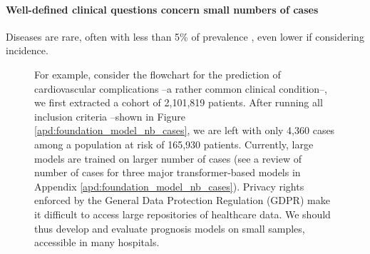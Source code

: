 \documentclass[french,12pt,twoside,a4paper]{book}
\begin{document}
\paragraph{Well-defined clinical questions concern small numbers of cases}
Diseases are rare, often with less than 5\% of prevalence
\citep{cnam2023pathologies}, even lower if considering incidence.
\begin{figure}[!h]
  \begin{minipage}{.54\linewidth}
    For example, consider the flowchart for the prediction of cardiovascular
    complications --a rather common clinical condition--, we first extracted a
    cohort of 2,101,819 patients. After running all inclusion criteria --shown in
    Figure \ref{apd:foundation_model_nb_cases}, we are left with only 4,360 cases
    among a population at risk of 165,930 patients. Currently, large models are
    trained on larger number of cases (see a review of number of cases for three
    major transformer-based models in Appendix \ref{apd:foundation_model_nb_cases}).
    Privacy rights enforced by the General Data Protection Regulation (GDPR) make it
    difficult to access large repositories of healthcare data. We should thus
    develop and evaluate prognosis models on small samples, accessible in many
    hospitals.


\end{minipage}
\end{figure}
\end{document}
